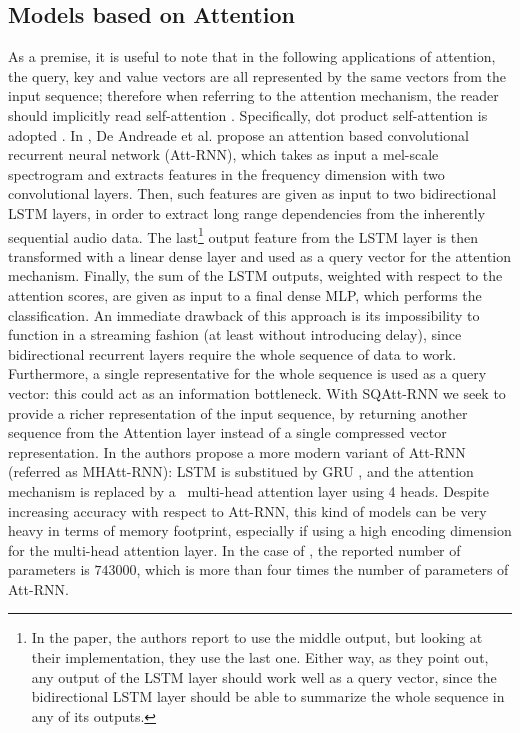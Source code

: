 \subsection{Models based on Attention}
As a premise, it is useful to note that in the following applications of attention, the query, key and value vectors are all represented by the same vectors from the input sequence; therefore when referring to the attention mechanism, the reader should implicitly read self-attention \cite{selfatt2016cheng}. Specifically, dot product self-attention is adopted \cite{luong2015effective}.
In \cite{attention2018andreade}, De Andreade et al. propose an attention based convolutional recurrent neural network (Att-RNN), which takes as input a mel-scale spectrogram and extracts features in the frequency dimension with two convolutional layers. Then, such features are given as input to two bidirectional LSTM \cite{hochreiter1997long} layers, in order to extract long range dependencies from the inherently sequential audio data. The last\footnote{In the paper, the authors report to use the middle output, but looking at their implementation, they use the last one. Either way, as they point out, any output of the LSTM layer should work well as a query vector, since the bidirectional LSTM layer should be able to summarize the whole sequence in any of its outputs.} output feature from the LSTM layer is then transformed with a linear dense layer and used as a query vector for the attention mechanism. Finally, the sum of the LSTM outputs, weighted with respect to the attention scores, are given as input to a final dense MLP, which performs the classification. An immediate drawback of this approach is its impossibility to function in a streaming fashion (at least without introducing delay), since bidirectional recurrent layers require the whole sequence of data to work. Furthermore, a single representative for the whole sequence is used as a query vector: this could act as an information bottleneck. With SQAtt-RNN we seek to provide a richer representation of the input sequence, by returning another sequence from the Attention layer instead of a single compressed vector representation.
In \cite{streamingkws2020Rybakov} the authors propose a more modern variant of Att-RNN (referred as MHAtt-RNN): LSTM is substitued by GRU \cite{Cho2014gru}, and the attention mechanism is replaced by a ~\mbox{multi-head} attention layer using 4 heads. Despite increasing accuracy with respect to Att-RNN, this kind of models can be very heavy in terms of memory footprint, especially if using a high encoding dimension for the multi-head attention layer. In the case of \cite{streamingkws2020Rybakov}, the reported number of parameters is $743000$, which is more than four times the number of parameters of Att-RNN.

